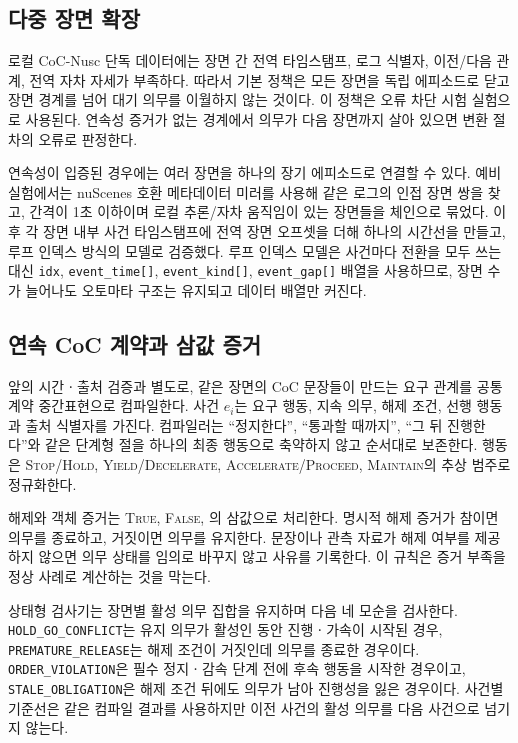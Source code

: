 \subsection{다중 장면 확장}
로컬 CoC-Nusc 단독 데이터에는 장면 간 전역 타임스탬프, 로그 식별자, 이전/다음 관계, 전역 자차 자세가 부족하다. 따라서 기본 정책은 모든 장면을 독립 에피소드로 닫고 장면 경계를 넘어 대기 의무를 이월하지 않는 것이다. 이 정책은 오류 차단 시험 실험으로 사용된다. 연속성 증거가 없는 경계에서 의무가 다음 장면까지 살아 있으면 변환 절차의 오류로 판정한다.

연속성이 입증된 경우에는 여러 장면을 하나의 장기 에피소드로 연결할 수 있다. 예비 실험에서는 nuScenes 호환 메타데이터 미러를 사용해 같은 로그의 인접 장면 쌍을 찾고, 간격이 1초 이하이며 로컬 추론/자차 움직임이 있는 장면들을 체인으로 묶었다. 이후 각 장면 내부 사건 타임스탬프에 전역 장면 오프셋을 더해 하나의 시간선을 만들고, 루프 인덱스 방식의 \uppaal 모델로 검증했다. 루프 인덱스 모델은 사건마다 전환을 모두 쓰는 대신 \texttt{idx}, \texttt{event\_time[]}, \texttt{event\_kind[]}, \texttt{event\_gap[]} 배열을 사용하므로, 장면 수가 늘어나도 오토마타 구조는 유지되고 데이터 배열만 커진다.

\subsection{연속 CoC 계약과 삼값 증거}
\label{sec:sequential-contract-method}

앞의 시간ㆍ출처 검증과 별도로, 같은 장면의 CoC 문장들이 만드는 요구 관계를 공통 계약 중간표현으로 컴파일한다. 사건 $e_i$는 요구 행동, 지속 의무, 해제 조건, 선행 행동과 출처 식별자를 가진다. 컴파일러는 ``정지한다'', ``통과할 때까지'', ``그 뒤 진행한다''와 같은 단계형 절을 하나의 최종 행동으로 축약하지 않고 순서대로 보존한다. 행동은 \textsc{Stop/Hold}, \textsc{Yield/Decelerate}, \textsc{Accelerate/Proceed}, \textsc{Maintain}의 추상 범주로 정규화한다.

해제와 객체 증거는 \textsc{True}, \textsc{False}, {\unknown}의 삼값으로 처리한다. 명시적 해제 증거가 참이면 의무를 종료하고, 거짓이면 의무를 유지한다. 문장이나 관측 자료가 해제 여부를 제공하지 않으면 의무 상태를 임의로 바꾸지 않고 {\unknown} 사유를 기록한다. 이 규칙은 증거 부족을 정상 사례로 계산하는 것을 막는다.

상태형 검사기는 장면별 활성 의무 집합을 유지하며 다음 네 모순을 검사한다. \texttt{HOLD\_GO\_CONFLICT}는 유지 의무가 활성인 동안 진행ㆍ가속이 시작된 경우, \texttt{PREMATURE\_RELEASE}는 해제 조건이 거짓인데 의무를 종료한 경우이다. \texttt{ORDER\_VIOLATION}은 필수 정지ㆍ감속 단계 전에 후속 행동을 시작한 경우이고, \texttt{STALE\_OBLIGATION}은 해제 조건 뒤에도 의무가 남아 진행성을 잃은 경우이다. 사건별 기준선은 같은 컴파일 결과를 사용하지만 이전 사건의 활성 의무를 다음 사건으로 넘기지 않는다.

